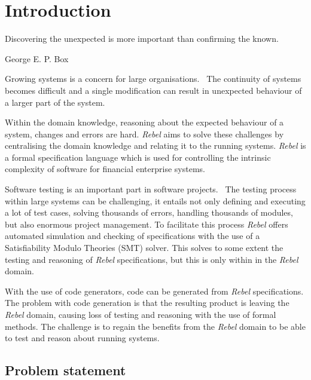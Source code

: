 \chapter{Introduction}

\epigraph{Discovering the unexpected is more important than confirming the
known.}{George E. P. Box}

Growing systems is a concern for large
organisations.~\cite[p.~1]{stoel_storm_vinju_bosman_2016} The continuity of
systems becomes difficult and a single modification can result in unexpected
behaviour of a larger part of the system.

Within the domain knowledge, reasoning about the expected behaviour of a system,
changes and errors are hard. \textit{Rebel} aims to solve these challenges by centralising the domain knowledge and relating
it to the running systems. \textit{Rebel} is a formal specification language which is
used for controlling the intrinsic complexity of software for financial
enterprise systems.~\cite[p.~1]{stoel_storm_vinju_bosman_2016}

Software testing is an important part in software projects.~\cite[p.~4]{myers2011art} The testing
process within large systems can be challenging, it entails not only defining
and executing a lot of test cases, solving thousands of errors, handling
thousands of modules, but also enormous project management. To facilitate this
process \textit{Rebel} offers automated simulation and checking of specifications with
the use of a Satisfiability Modulo Theories (SMT) solver. This solves to some
extent the testing and reasoning of \textit{Rebel} specifications, but this is only
within in the \textit{Rebel} domain.

With the use of code generators, code can be
generated from \textit{Rebel} specifications. The problem with code generation is that the resulting
product is leaving the \textit{Rebel} domain, causing loss of testing and reasoning with
the use of formal methods. The challenge is to regain the benefits from the
\textit{Rebel} domain to be able to test and reason about running systems.

\section{Problem statement}\label{sec:problem-statement}


